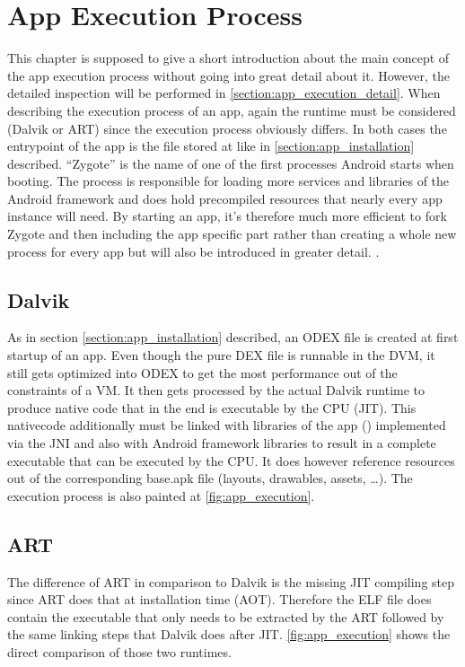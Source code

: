 \section{App Execution Process}\label{section:app_execution_simple}
This chapter is supposed to give a short introduction about the
main concept of the app execution process without going into
great detail about it. However, the detailed inspection will
be performed in \autoref{section:app_execution_detail}.
When describing the execution process of an app, again the
runtime must be considered (Dalvik or ART) since the execution process
obviously differs. In both cases the entrypoint of the app is the
file stored at  like in
\autoref{section:app_installation} described. ``Zygote'' is
the name of one of the first processes Android starts when booting.
The process is responsible for loading more services and libraries
of the Android framework and does hold precompiled resources that
nearly every app instance will need.
By starting an app, it's therefore much more efficient to fork
Zygote and then including the app specific part rather than
creating a whole new process for every app but will also be introduced
in greater detail.
\parencite{hackershandbook}.

\subsection{Dalvik}
As in section \autoref{section:app_installation} described, an
ODEX file is created at first startup of an app. Even though
the pure DEX file is runnable in the DVM, it still gets optimized
into ODEX to get the most performance out of the
constraints of a VM.
It then gets processed by the actual Dalvik runtime to produce
native code that in the end is executable by the CPU (JIT).
This nativecode additionally must be linked with libraries of the app
() implemented via the JNI
and also with Android framework libraries to result in a complete
executable that can be executed by the CPU. It does however
reference resources out of the corresponding base.apk file (layouts,
drawables, assets, \ldots). The execution process is also painted
at \autoref{fig:app_execution}.

\subsection{ART}
The difference of ART in comparison to Dalvik is the missing
JIT compiling step since ART does that at installation time
(AOT). Therefore the ELF file does contain the executable that
only needs to be extracted by the ART followed by the same
linking steps that Dalvik does after JIT. \autoref{fig:app_execution}
shows the direct comparison of those two runtimes.

